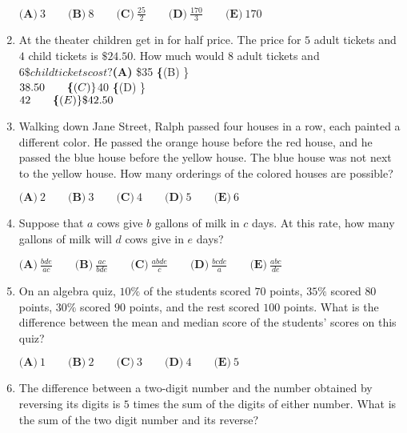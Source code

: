 \documentclass{article}
\begin{document}
\begin{enumerate}[label=\arabic*., itemsep=0.5em]
$ \textbf{(A)}\ 3\qquad\textbf{(B)}\ 8\qquad\textbf{(C)}\ \frac{25}{2}\qquad\textbf{(D)}\ \frac{170}{3}\qquad\textbf{(E)}\ 170$\par \vspace{0.5em}\item At the theater children get in for half price.  The price for $5$ adult tickets and $4$ child tickets is $\$24.50$.  How much would $8$ adult tickets and $6\$ child tickets cost?

$\textbf{(A) }\$35\qquad
\textbf\{(B) \}\\$38.50\qquad
\textbf\{(C) \}\\$40\qquad
\textbf\{(D) \}\\$42\qquad
\textbf\{(E) \}\$42.50$\par \vspace{0.5em}\item Walking down Jane Street, Ralph passed four houses in a row, each painted a different color. He passed the orange house before the red house, and he passed the blue house before the yellow house. The blue house was not next to the yellow house. How many orderings of the colored houses are possible?

$ \textbf{(A)}\ 2\qquad\textbf{(B)}\ 3\qquad\textbf{(C)}\ 4\qquad\textbf{(D)}\ 5\qquad\textbf{(E)}\ 6$\par \vspace{0.5em}\item Suppose that $a$ cows give $b$ gallons of milk in $c$ days. At this rate, how many gallons of milk will $d$ cows give in $e$ days?

$ \textbf{(A)}\ \frac{bde}{ac}\qquad\textbf{(B)}\ \frac{ac}{bde}\qquad\textbf{(C)}\ \frac{abde}{c}\qquad\textbf{(D)}\ \frac{bcde}{a}\qquad\textbf{(E)}\ \frac{abc}{de}$\par \vspace{0.5em}\item On an algebra quiz, $10\%$ of the students scored $70$ points, $35\%$ scored $80$ points, $30\%$ scored $90$ points, and the rest scored $100$ points. What is the difference between the mean and median score of the students' scores on this quiz?

$ \textbf{(A)}\ 1\qquad\textbf{(B)}\ 2\qquad\textbf{(C)}\ 3\qquad\textbf{(D)}\ 4\qquad\textbf{(E)}\ 5$\par \vspace{0.5em}\item The difference between a two-digit number and the number obtained by reversing its digits is $5$ times the sum of the digits of either number.  What is the sum of the two digit number and its reverse?


\end{enumerate}
\end{document}
